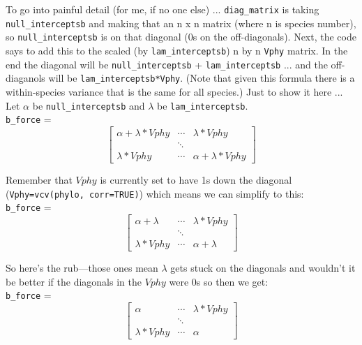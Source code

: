 \documentclass[11pt,letter]{article}
\begin{document}
To go into painful detail (for me, if no one else) ... \verb|diag_matrix| is taking \verb|null_interceptsb| and making that an n x n matrix (where n is species number), so \verb|null_interceptsb| is on that diagonal (0s on the off-diagonals). Next, the code says to add this to the scaled (by \verb|lam_interceptsb|) n by n \verb|Vphy| matrix. In the end the diagonal will be \verb|null_interceptsb| + \verb|lam_interceptsb| ... and the off-diaganols will be \verb|lam_interceptsb*Vphy|. (Note that given this formula there is a within-species variance that is the same for all species.) Just to show it here ... \\

Let $\alpha$ be  \verb|null_interceptsb| and $\lambda$ be \verb|lam_interceptsb|.\\

\verb|b_force| = 
\begin{equation}
 \begin{bmatrix}
  \alpha+\lambda*Vphy &  \cdots & \lambda*Vphy \\
   & \ddots \\
  \lambda*Vphy & \cdots &   \alpha+\lambda*Vphy
 \end{bmatrix}
\end{equation}

\vspace{2ex}
Remember that $Vphy$ is currently set to have 1s down the diagonal (\verb|Vphy=vcv(phylo, corr=TRUE)|) which means we can simplify to this:\\

\verb|b_force| = 
\begin{equation}
 \begin{bmatrix}
  \alpha+\lambda &  \cdots & \lambda*Vphy \\
   & \ddots \\
  \lambda*Vphy & \cdots &   \alpha+\lambda
 \end{bmatrix}
\end{equation}

\vspace{2ex}
So here's the rub---those ones mean $\lambda$ gets stuck on the diagonals and wouldn't it be better if the diagonals in the $Vphy$ were 0s so then we get:\\

\verb|b_force| = 
\begin{equation}
 \begin{bmatrix}
  \alpha &  \cdots & \lambda*Vphy \\
   & \ddots \\
  \lambda*Vphy & \cdots &   \alpha
 \end{bmatrix}
\end{equation}
\end{document}
